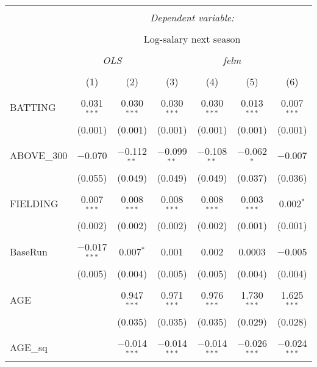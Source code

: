 
\begin{table}[!htbp] \centering
  \caption{}
  \label{}
  \scriptsize
\begin{tabular}{@{\extracolsep{5pt}}lcccccc}
\\[-1.8ex]\hline
\hline \\[-1.8ex]
 & \multicolumn{6}{c}{\textit{Dependent variable:}} \\
\cline{2-7}
\\[-1.8ex] & \multicolumn{6}{c}{Log-salary next season} \\
\\[-1.8ex] & \multicolumn{2}{c}{\textit{OLS}} & \multicolumn{4}{c}{\textit{felm}} \\
\\[-1.8ex] & (1) & (2) & (3) & (4) & (5) & (6)\\
\hline \\[-1.8ex]
 BATTING & 0.031$^{***}$ & 0.030$^{***}$ & 0.030$^{***}$ & 0.030$^{***}$ & 0.013$^{***}$ & 0.007$^{***}$ \\
  & (0.001) & (0.001) & (0.001) & (0.001) & (0.001) & (0.001) \\
  & & & & & & \\
 ABOVE\_300 & $-$0.070 & $-$0.112$^{**}$ & $-$0.099$^{**}$ & $-$0.108$^{**}$ & $-$0.062$^{*}$ & $-$0.007 \\
  & (0.055) & (0.049) & (0.049) & (0.049) & (0.037) & (0.036) \\
  & & & & & & \\
 FIELDING & 0.007$^{***}$ & 0.008$^{***}$ & 0.008$^{***}$ & 0.008$^{***}$ & 0.003$^{***}$ & 0.002$^{*}$ \\
  & (0.002) & (0.002) & (0.002) & (0.002) & (0.001) & (0.001) \\
  & & & & & & \\
 BaseRun & $-$0.017$^{***}$ & 0.007$^{*}$ & 0.001 & 0.002 & 0.0003 & $-$0.005 \\
  & (0.005) & (0.004) & (0.005) & (0.005) & (0.004) & (0.004) \\
  & & & & & & \\
 AGE &  & 0.947$^{***}$ & 0.971$^{***}$ & 0.976$^{***}$ & 1.730$^{***}$ & 1.625$^{***}$ \\
  &  & (0.035) & (0.035) & (0.035) & (0.029) & (0.028) \\
  & & & & & & \\
 AGE\_sq &  & $-$0.014$^{***}$ & $-$0.014$^{***}$ & $-$0.014$^{***}$ & $-$0.026$^{***}$ & $-$0.024$^{***}$ \\

\end{tabular}
\end{table}
